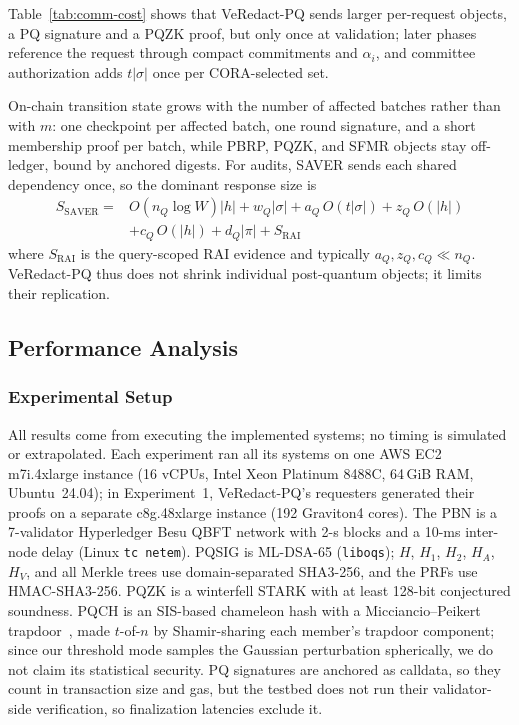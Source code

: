 \documentclass[lettersize,journal]{IEEEtran}
\begin{document}
Table~\ref{tab:comm-cost} shows that VeRedact-PQ sends larger
per-request objects, a PQ signature and a PQZK proof, but only once at
validation; later phases reference the request through compact
commitments and $\alpha_i$, and committee authorization adds $t|\sigma|$
once per CORA-selected set.

On-chain transition state grows with the number of affected batches
rather than with $m$: one checkpoint per affected batch, one round
signature, and a short membership proof per batch, while PBRP, PQZK, and
SFMR objects stay off-ledger, bound by anchored digests. For audits,
SAVER sends each shared dependency once, so the dominant response size is
\begin{equation}
\begin{aligned}
S_{\mathrm{SAVER}}
={}&O(n_Q\log W)|h|
+w_Q|\sigma|
+a_Q\,O(t|\sigma|)
+z_Q\,O(|h|)\\
&+c_Q\,O(|h|)
+d_Q|\pi|
+S_{\mathrm{RAI}}
\end{aligned}
\label{eq:saver_comm}
\end{equation}
where $S_{\mathrm{RAI}}$ is the query-scoped RAI evidence and typically
$a_Q,z_Q,c_Q\ll n_Q$. VeRedact-PQ thus does not shrink individual
post-quantum objects; it limits their replication.


\subsection{Performance Analysis}
\label{subsec:performance-analysis}

\subsubsection*{\textbf{Experimental Setup}}
All results come from executing the implemented systems; no timing is
simulated or extrapolated. Each experiment ran all its systems on one
AWS EC2 m7i.4xlarge instance (16 vCPUs, Intel Xeon Platinum 8488C,
64\,GiB RAM, Ubuntu~24.04); in Experiment~1, VeRedact-PQ's requesters
generated their proofs on a separate c8g.48xlarge instance (192
Graviton4 cores). The PBN is a 7-validator Hyperledger Besu QBFT network
with 2-s blocks and a 10-ms inter-node delay (Linux \texttt{tc netem}).
PQSIG is ML-DSA-65 (\texttt{liboqs}); $H$, $H_1$, $H_2$, $H_A$, $H_V$,
and all Merkle trees use domain-separated SHA3-256, and the PRFs use
HMAC-SHA3-256. PQZK is a winterfell STARK with at least 128-bit
conjectured soundness. PQCH is an SIS-based chameleon hash with a
Micciancio--Peikert trapdoor~\cite{ref10,ref17}, made $t$-of-$n$ by
Shamir-sharing each member's trapdoor component; since our threshold
mode samples the Gaussian perturbation spherically, we do not claim its
statistical security. PQ signatures are anchored as calldata, so they
count in transaction size and gas, but the testbed does not run their
validator-side verification, so finalization latencies exclude it.
\end{document}
